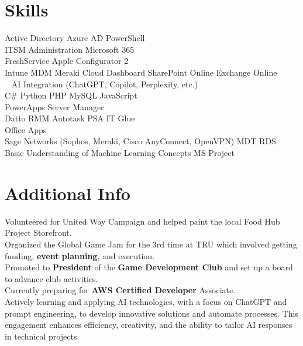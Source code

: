 \documentclass[]{pratham-resume-openfont}
\begin{document}
\begin{minipage}[t]{0.34\textwidth}
\section{Skills}
Active Directory \textbullet{} Azure AD \textbullet{} PowerShell \\
\textbullet{} ITSM Administration \textbullet{} Microsoft 365 \textbullet{}\\ 
 FreshService \textbullet{} Apple Configurator 2 \\
\textbullet{} Intune MDM \textbullet{} Meraki Cloud Dashboard 
 SharePoint Online \textbullet{} Exchange Online \\
\ \textbullet{} AI Integration (ChatGPT, Copilot, Perplexity, etc.)\\
C\# \textbullet{} Python \textbullet{} PHP \textbullet{} MySQL \textbullet{} JavaScript  \\
\textbullet{} PowerApps \textbullet{} Server Manager \textbullet{} \\
Datto RMM \textbullet{} Autotask PSA \textbullet{} IT Glue \\ 
\textbullet{} Office Apps \\
Sage \textbullet{} Networks (Sophos, Meraki, Cisco AnyConnect, OpenVPN) \textbullet{} MDT \textbullet{} RDS \\
\textbullet{} Basic Understanding of Machine Learning Concepts \textbullet{} MS Project \\
\sectionsep

\section{Additional Info}
\textbullet{} Volunteered for United Way Campaign and helped paint the local Food Hub Project Storefront. \\
\textbullet{} Organized the Global Game Jam for the 3rd time at TRU which involved getting funding, {\bf event planning}, and execution. \\
\textbullet{} Promoted to {\bf President} of the {\bf Game Development Club} and set up a board to advance club activities. \\
\textbullet{} Currently preparing for {\bf AWS Certified Developer} Associate. \\
\textbullet{} Actively learning and applying AI technologies, with a focus on ChatGPT and prompt engineering, to develop innovative solutions and automate processes. This engagement enhances efficiency, creativity, and the ability to tailor AI responses in technical projects.
\sectionsep

%
%

\end{minipage} 
\end{document}
